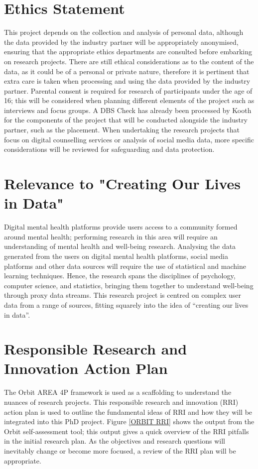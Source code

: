\documentclass[12pt]{article}
\begin{document}
\section{Ethics Statement}
This project depends on the collection and analysis of personal data, although the data provided by the industry partner will be appropriately anonymised, ensuring that the appropriate ethics departments are consulted before embarking on research projects. There are still ethical considerations as to the content of the data, as it could be of a personal or private nature, therefore it is pertinent that extra care is taken when processing and using the data provided by the industry partner. Parental consent is required for research of participants under the age of 16; this will be considered when planning different elements of the project such as interviews and focus groups. A DBS Check has already been processed by Kooth for the components of the project that will be conducted alongside the industry partner, such as the placement. When undertaking the research projects that focus on digital counselling services or analysis of social media data, more specific considerations will be reviewed for safeguarding and data protection.
\section{Relevance to "Creating Our Lives in Data"}
Digital mental health platforms provide users access to a community formed around mental health; performing research in this area will require an understanding of mental health and well-being research. Analysing the data generated from the users on digital mental health platforms, social media platforms and other data sources will require the use of statistical and machine learning techniques. Hence, the research spans the disciplines of psychology, computer science, and statistics, bringing them together to understand well-being through proxy data streams. This research project is centred on complex user data from a range of sources, fitting squarely into the idea of “creating our lives in data”.
\section{Responsible Research and Innovation Action Plan}

The Orbit AREA 4P framework is used as a scaffolding to understand the nuances of research projects. This responsible research and innovation (RRI) action plan is used to outline the fundamental ideas of RRI and how they will be integrated into this PhD project. Figure \ref{ORBIT RRI} shows the output from the Orbit self-assessment tool; this output gives a quick overview of the RRI pitfalls in the initial research plan. As the objectives and research questions will inevitably change or become more focused, a review of the RRI plan will be appropriate. \\
\end{document}
